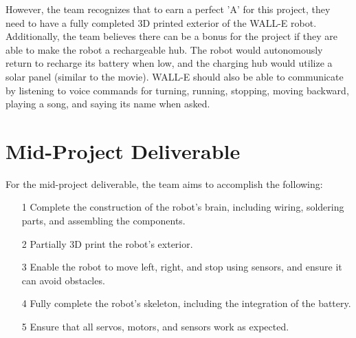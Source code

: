 \documentclass[12pt]{article}
\begin{document}
However, the team recognizes that to earn a perfect 'A' for this project, they need to have a fully completed 3D printed exterior of the WALL-E robot.\\

Additionally, the team believes there can be a bonus for the project if they are able to make the robot a rechargeable hub. The robot would autonomously return to recharge its battery when low, and the charging hub would utilize a solar panel (similar to the movie). WALL-E should also be able to communicate by listening to voice commands for turning, running, stopping, moving backward, playing a song, and saying its name when asked.

\section{Mid-Project Deliverable}

For the mid-project deliverable, the team aims to accomplish the following:

\begin{itemize}
    \item[1] Complete the construction of the robot's brain, including wiring, soldering parts, and assembling the components.
    \item[2] Partially 3D print the robot's exterior.
    \item[3] Enable the robot to move left, right, and stop using sensors, and ensure it can avoid obstacles.
    \item[4] Fully complete the robot's skeleton, including the integration of the battery.
    \item[5] Ensure that all servos, motors, and sensors work as expected. 
\end{itemize}
\end{document}
